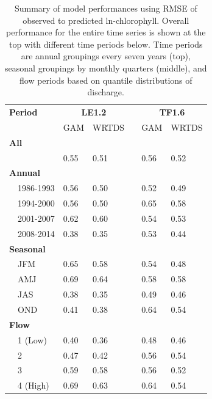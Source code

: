 \documentclass[letterpaper,12pt,oneside]{article}\usepackage[]{graphicx}\usepackage[]{color}
\begin{document}
\begin{table}[!tbp]
\caption{Summary of model performances using \ac{RMSE} of observed to predicted ln-chlorophyll.  Overall performance for the entire time series is shown at the top with different time periods below.  Time periods are annual groupings every seven years (top), seasonal groupings by monthly quarters (middle), and flow periods based on quantile distributions of discharge.\label{tab:perftoobs}} 
\begin{center}
\begin{tabular}{lllcll}
\hline\hline
\multicolumn{1}{l}{\bfseries Period}&\multicolumn{2}{c}{\bfseries LE1.2}&\multicolumn{1}{c}{\bfseries }&\multicolumn{2}{c}{\bfseries TF1.6}\tabularnewline
\cline{2-3} \cline{5-6}
\multicolumn{1}{l}{}&\multicolumn{1}{c}{GAM}&\multicolumn{1}{c}{WRTDS}&\multicolumn{1}{c}{}&\multicolumn{1}{c}{GAM}&\multicolumn{1}{c}{WRTDS}\tabularnewline
\hline
{\bfseries All}&&&&&\tabularnewline
~~&0.55&0.51&&0.56&0.52\tabularnewline
\hline
{\bfseries Annual}&&&&&\tabularnewline
~~1986-1993&0.56&0.50&&0.52&0.49\tabularnewline
~~1994-2000&0.56&0.50&&0.65&0.58\tabularnewline
~~2001-2007&0.62&0.60&&0.54&0.53\tabularnewline
~~2008-2014&0.38&0.35&&0.53&0.44\tabularnewline
\hline
{\bfseries Seasonal}&&&&&\tabularnewline
~~JFM&0.65&0.58&&0.54&0.48\tabularnewline
~~AMJ&0.69&0.64&&0.58&0.58\tabularnewline
~~JAS&0.38&0.35&&0.49&0.46\tabularnewline
~~OND&0.41&0.38&&0.64&0.54\tabularnewline
\hline
{\bfseries Flow}&&&&&\tabularnewline
~~1 (Low)&0.40&0.36&&0.48&0.46\tabularnewline
~~2&0.47&0.42&&0.56&0.54\tabularnewline
~~3&0.59&0.58&&0.56&0.52\tabularnewline
~~4 (High)&0.69&0.63&&0.64&0.54\tabularnewline
\hline
\end{tabular}\end{center}

\end{table}
\end{document}
